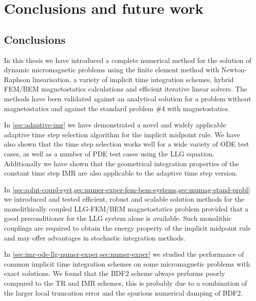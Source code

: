 \chapter{Conclusions and future work}

\section{Conclusions}

In this thesis we have introduced a complete numerical method for the solution of dynamic micromagnetic problems using the finite element method with Newton-Raphson linearisation, a variety of implicit time integration schemes, hybrid FEM/BEM magnetostatics calculations and efficient iterative linear solvers.
The methods have been validated against an analytical solution for a problem without magnetostatics and against the \mumag standard problem \#4 with magnetostatics.

In \cref{sec:adaptive-imr} we have demonstrated a novel and widely applicable adaptive time step selection algorithm for the implicit midpoint rule.
We have also shown that the time step selection works well for a wide variety of ODE test cases, as well as a number of PDE test cases using the LLG equation.
Additionally we have shown that the geometrical integration properties of the constant time step IMR are also applicable to the adaptive time step version.

In \cref{sec:solut-coupl-syst,sec:numer-exper-fem-bem-systems,sec:mumag-stand-probl} we introduced and tested efficient, robust and scalable solution methods for the monolithically coupled LLG-FEM/BEM magnetostatics problem provided that a good preconditioner for the LLG system alone is available.
Such monolithic couplings are required to obtain the energy property of the implicit midpoint rule and may offer advantages in stochastic integration methods.

In \cref{sec:imr-ode-llg-numer-exper,sec:numer-exper} we studied the performance of common implicit time integration schemes on some micromagnetic problems with exact solutions.
We found that the BDF2 scheme always performs poorly compared to the TR and IMR schemes, this is probably due to a combination of the larger local truncation error and the spurious numerical damping of BDF2.

